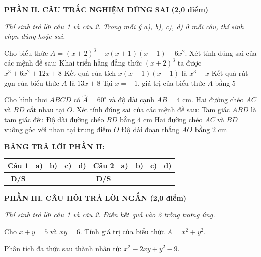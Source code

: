 \documentclass[12pt,a4paper]{article}
\begin{document}
\setcounter{ex}{0}
\noindent\textbf{\large PHẦN II. CÂU TRẮC NGHIỆM ĐÚNG SAI (2,0 điểm)}

\textit{Thí sinh trả lời câu 1 và câu 2. Trong mỗi ý a), b), c), d) ở mỗi câu, thí sinh chọn đúng hoặc sai.}

\vspace{1mm}
\begin{ex}
Cho biểu thức $A = (x + 2)^3 - x(x + 1)(x - 1) - 6x^2$. Xét tính đúng sai của các mệnh đề sau:
\choiceTF
{\True Khai triển hằng đẳng thức $(x + 2)^3$ ta được $x^3 + 6x^2 + 12x + 8$}
{\True Kết quả của tích $x(x + 1)(x - 1)$ là $x^3 - x$}
{\True Kết quả rút gọn của biểu thức $A$ là $13x + 8$}
{Tại $x = -1$, giá trị của biểu thức $A$ bằng $5$}
\end{ex}

\begin{ex}
Cho hình thoi $ABCD$ có $\widehat{A} = 60^\circ$ và độ dài cạnh $AB = 4\text{ cm}$. Hai đường chéo $AC$ và $BD$ cắt nhau tại $O$. Xét tính đúng sai của các mệnh đề sau:
\choiceTF
{\True Tam giác $ABD$ là tam giác đều}
{\True Độ dài đường chéo $BD$ bằng $4\text{ cm}$}
{\True Hai đường chéo $AC$ và $BD$ vuông góc với nhau tại trung điểm $O$}
{Độ dài đoạn thẳng $AO$ bằng $2\text{ cm}$}
\end{ex}


\noindent\textbf{BẢNG TRẢ LỜI PHẦN II:}
\begin{center}
\begin{tabular}{|c|c|c|c|c||c|c|c|c|c|}
\hline
\textbf{Câu 1} & \textbf{a)} & \textbf{b)} & \textbf{c)} & \textbf{d)} & \textbf{Câu 2} & \textbf{a)} & \textbf{b)} & \textbf{c)} & \textbf{d)} \\
\hline
\textbf{Đ/S} & \rule{0pt}{0.6cm} & & & & \textbf{Đ/S} & & & & \\
\hline
\end{tabular}
\end{center}
\vspace{2mm}

\setcounter{ex}{0}
\noindent\textbf{\large PHẦN III. CÂU HỎI TRẢ LỜI NGẮN (2,0 điểm)}

\textit{Thí sinh trả lời câu 1 và câu 2. Điền kết quả vào ô trống tương ứng.}

\vspace{1mm}
\begin{ex}
Cho $x + y = 5$ và $xy = 6$. Tính giá trị của biểu thức $A = x^2 + y^2$. 
\end{ex}

\begin{ex}
Phân tích đa thức sau thành nhân tử: $x^2 - 2xy + y^2 - 9$. 
\end{ex}
\end{document}
